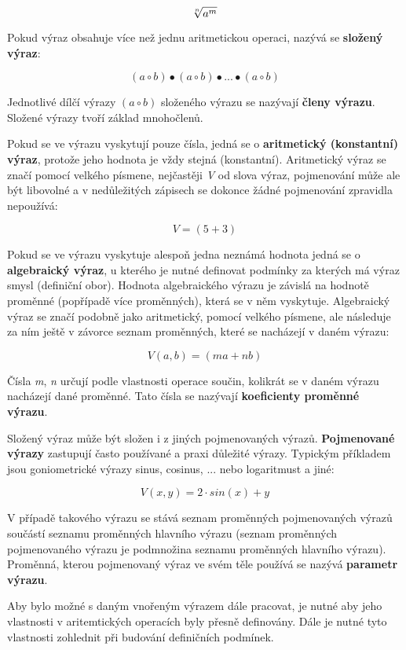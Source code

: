 $$ \root n\of{a^m} $$

Pokud výraz obsahuje více než jednu aritmetickou operaci, nazývá se {\bf složený výraz}:

$$ (a \circ b) \bullet (a \circ b) \bullet ... \bullet (a \circ b) $$

Jednotlivé dílčí výrazy $(a \circ b)$ složeného výrazu se nazývají {\bf členy výrazu}. Složené výrazy tvoří základ mnohočlenů.

Pokud se ve výrazu vyskytují pouze čísla, jedná se o {\bf aritmetický (konstantní) výraz}, protože jeho hodnota je vždy stejná (konstantní). Aritmetický výraz se značí pomocí velkého písmene, nejčastěji {\it V} od slova výraz, pojmenování může ale být libovolné a v nedůležitých zápisech se dokonce žádné pojmenování zpravidla nepoužívá:

$$ V = (5 + 3) $$

Pokud se ve výrazu vyskytuje alespoň jedna neznámá hodnota jedná se o {\bf algebraický výraz}, u kterého je nutné definovat podmínky za kterých má výraz smysl (definiční obor). Hodnota algebraického výrazu je závislá na hodnotě proměnné (popřípadě více proměnných), která se v něm vyskytuje. Algebraický výraz se značí podobně jako aritmetický, pomocí velkého písmene, ale následuje za ním ještě v závorce seznam proměnných, které se nacházejí v daném výrazu:

$$ V(a,b) =(ma + nb) $$

Čísla {\it m}, {\it n} určují podle vlastnosti operace součin, kolikrát se v daném výrazu nacházejí dané proměnné. Tato čísla se nazývají {\bf koeficienty proměnné výrazu}.

Složený výraz může být složen i z jiných pojmenovaných výrazů. {\bf Pojmenované výrazy} zastupují často používané a praxi důležité výrazy. Typickým příkladem jsou goniometrické výrazy sinus, cosinus, ... nebo logaritmust a jiné:

$$ V(x,y) = 2\cdot sin(x) + y $$

V případě  takového výrazu se stává seznam proměnných pojmenovaných výrazů součástí seznamu proměnných hlavního výrazu (seznam proměnných pojmenovaného výrazu je podmnožina seznamu proměnných hlavního výrazu). Proměnná, kterou pojmenovaný výraz ve svém těle používá se nazývá {\bf parametr výrazu}. 

Aby bylo možné s daným vnořeným výrazem dále pracovat, je nutné aby jeho vlastnosti v aritemtických operacích byly přesně definovány. Dále je nutné tyto vlastnosti zohlednit při budování definičních podmínek.

